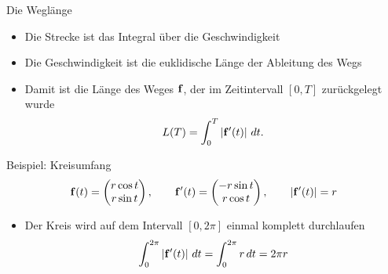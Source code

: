 \begin{frame}{Die Weglänge}
  \pause
\begin{itemize}
\item Die Strecke ist das Integral über die Geschwindigkeit
\item Die Geschwindigkeit ist die euklidische Länge der Ableitung des
  Wegs
\item Damit ist die Länge des Weges $\mathbf{f}$, der im Zeitintervall $[0,T]$ zurückgelegt wurde
\begin{gather*}
    L(T) = \int_0^T \left|\mathbf{f}'(t)\right| \,dt.
\end{gather*}
\end{itemize}
\end{frame}

\begin{frame}{Beispiel: Kreisumfang}
    \begin{gather*}
        \mathbf{f}(t) = \begin{pmatrix}
            r \cos t\\r \sin t
        \end{pmatrix},
        \qquad
        \mathbf{f}'(t) = \begin{pmatrix}
            -r \sin t\\ r\cos t
        \end{pmatrix},
        \qquad
        \left|\mathbf{f}'(t)\right| = r
    \end{gather*}
    \begin{itemize}
    \item Der Kreis wird auf dem Intervall $[0,2\pi]$ einmal komplett durchlaufen
        \begin{gather*}
            \int_0^{2\pi} \left|\mathbf{f}'(t)\right| \,dt = \int_0^{2\pi} r\,dt = 2\pi r
        \end{gather*}
    \end{itemize}
\end{frame}


